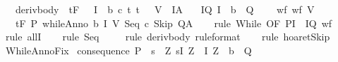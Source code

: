 \begin{isabellebody}
\ \ \ deriv{\isacharunderscore}body{\isacharcolon}\ {\isachardoublequoteopen}{\isasymforall}{\isasymsigma}{\isachardot}\ {\isasymGamma}{\isacharcomma}{\isasymTheta}{\isasymturnstile}\isactrlsub t\isactrlbsub {\isacharslash}F\isactrlesub \ {\isacharparenleft}{\isacharbraceleft}{\isasymsigma}{\isacharbraceright}\ {\isasyminter}\ I\ {\isasyminter}\ b{\isacharparenright}\ c\ {\isacharparenleft}{\isacharbraceleft}t{\isachardot}\ {\isacharparenleft}t{\isacharcomma}\ {\isasymsigma}{\isacharparenright}\ {\isasymin}\ V{\isacharbraceright}\ {\isasyminter}\ I{\isacharparenright}{\isacharcomma}A{\isachardoublequoteclose}\isanewline
\ \ \ I{\isacharunderscore}Q{\isacharcolon}\ {\isachardoublequoteopen}I\ {\isasyminter}\ {\isacharminus}b\ {\isasymsubseteq}\ Q{\isachardoublequoteclose}\ \isanewline
\ \ \ wf{\isacharcolon}\ {\isachardoublequoteopen}wf\ V{\isachardoublequoteclose}\isanewline
\ \ \ {\isachardoublequoteopen}{\isasymGamma}{\isacharcomma}{\isasymTheta}{\isasymturnstile}\isactrlsub t\isactrlbsub {\isacharslash}F\isactrlesub \ P\ {\isacharparenleft}whileAnno\ b\ I\ V\ {\isacharparenleft}Seq\ c\ Skip{\isacharparenright}{\isacharparenright}\ Q{\isacharcomma}A{\isachardoublequoteclose}\isanewline
%
\isadelimproof
\ \ %
\endisadelimproof
%
\isatagproof
{}\isamarkupfalse%
\ {\isacharparenleft}rule\ While\ {\isacharbrackleft}OF\ P{\isacharunderscore}I\ {\isacharunderscore}\ I{\isacharunderscore}Q\ wf{\isacharbrackright}{\isacharparenright}\isanewline
\ \ \isamarkupfalse%
\ {\isacharparenleft}rule\ allI{\isacharparenright}\isanewline
\ \ \isamarkupfalse%
\ {\isacharparenleft}rule\ Seq{\isacharparenright}\isanewline
\ \ \isamarkupfalse%
\ \ {\isacharparenleft}rule\ deriv{\isacharunderscore}body\ {\isacharbrackleft}rule{\isacharunderscore}format{\isacharbrackright}{\isacharparenright}\isanewline
\ \ \isamarkupfalse%
\ {\isacharparenleft}rule\ hoaret{\isachardot}Skip{\isacharparenright}\isanewline
\ \ \isamarkupfalse%
%
\endisatagproof
{\isafoldproof}%
%
\isadelimproof
\isanewline
%
\endisadelimproof
\isanewline
{}\isamarkupfalse%
\ WhileAnnoFix{\isacharcolon}\isanewline
{}\ consequence{\isacharcolon}\ {\isachardoublequoteopen}P\ {\isasymsubseteq}\ {\isacharbraceleft}s{\isachardot}\ {\isacharparenleft}{\isasymexists}\ Z{\isachardot}\ s{\isasymin}I\ Z\ {\isasymand}\ {\isacharparenleft}I\ Z\ {\isasyminter}\ {\isacharminus}b\ {\isasymsubseteq}\ Q{\isacharparenright}{\isacharparenright}\ {\isacharbraceright}{\isachardoublequoteclose}\isanewline

\end{isabellebody}
